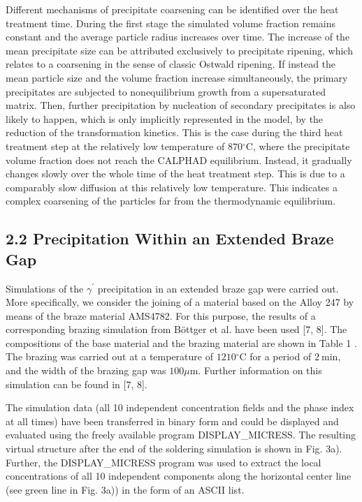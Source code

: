 \documentclass[10pt]{article}
\begin{document}
Different mechanisms of precipitate coarsening can be identified over the heat treatment time. During the first stage the simulated volume fraction remains constant and the average particle radius increases over time. The increase of the mean precipitate size can be attributed exclusively to precipitate ripening, which relates to a coarsening in the sense of classic Ostwald ripening. If instead the mean particle size and the volume fraction increase simultaneously, the primary precipitates are subjected to nonequilibrium growth from a supersaturated matrix. Then, further precipitation by nucleation of secondary precipitates is also likely to happen, which is only implicitly represented in the model, by the reduction of the transformation kinetics. This is the case during the third heat treatment step at the relatively low temperature of $870{ }^{\circ} \mathrm{C}$, where the precipitate volume fraction does not reach the CALPHAD equilibrium. Instead, it gradually changes slowly over the whole time of the heat treatment step. This is due to a comparably slow diffusion at this relatively low temperature. This indicates a complex coarsening of the particles far from the thermodynamic equilibrium.

\subsection*{2.2 Precipitation Within an Extended Braze Gap}
Simulations of the $\gamma^{\prime}$ precipitation in an extended braze gap were carried out. More specifically, we consider the joining of a material based on the Alloy 247 by means of the braze material AMS4782. For this purpose, the results of a corresponding brazing simulation from Böttger et al. have been used [7, 8]. The compositions of the base material and the brazing material are shown in Table 1 . The brazing was carried out at a temperature of $1210{ }^{\circ} \mathrm{C}$ for a period of $2 \mathrm{~min}$, and the width of the brazing gap was $100 \mu \mathrm{m}$. Further information on this simulation can be found in [7, 8].

The simulation data (all 10 independent concentration fields and the phase index at all times) have been transferred in binary form and could be displayed and evaluated using the freely available program DISPLAY\_MICRESS. The resulting virtual structure after the end of the soldering simulation is shown in Fig. 3a). Further, the DISPLAY\_MICRESS program was used to extract the local concentrations of all 10 independent components along the horizontal center line (see green line in Fig. 3a)) in the form of an ASCII list.
\end{document}
